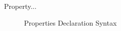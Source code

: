 Property...

\begin{figure}
\verbatimfont{\small}
\begin{framed}

\end{framed}
\caption{Properties Declaration Syntax}
\label{fig:properties-syntax}
\end{figure}
